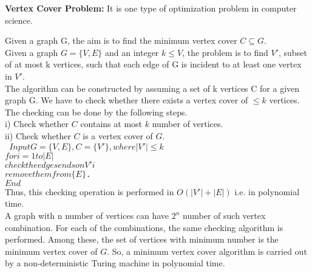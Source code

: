 \documentclass[11pt]{article}
\begin{document}
\vspace*{0.3cm}
\hspace*{0.1cm} \textbf{Vertex Cover Problem:} It is one type of optimization problem in computer science.

Given a graph G, the aim is to find the minimum vertex cover $C \subseteq G$.\\
\hspace*{0.5cm} Given a graph $G = \{V, E\}$ and an integer $k \leq V$, the problem is to find $V'$, subset of at most k vertices,
such that each edge of G is incident to at least one vertex in $V'$.\\
\hspace*{0.5cm} The algorithm can be constructed by assuming a set of k vertices C for a given graph G. We have to
check whether there exists a vertex cover of $\leq k$ vertices.\\
\hspace*{0.5cm} The checking can be done by the following steps.\\

\vspace*{0.2cm}
i) Check whether $C$ contains at most $k$ number of vertices.\\
ii) Check whether $C$ is a vertex cover of $G$.\\
\texttt{
\hspace*{2cm} $Input G = \{V, E\}, C= \{V'\}, where | V' |\leq k$\\
\hspace*{2cm} $for i = 1 to | E |$\\
\hspace*{2.5cm} $check the edges ends on V'i$\\
\hspace*{2.5cm} $remove them from \{E\}$.\\
\hspace*{2cm} $End$\\
}
\vspace*{0.2cm}
Thus, this checking operation is performed in $O(| V' |+| E |)$ i.e. in polynomial time.\\
\hspace*{0.5cm} A graph with n number of vertices can have $2 ^{n}$ number of such vertex combination. For each of the
combinations, the same checking algorithm is performed. Among these, the set of vertices with minimum
number is the minimum vertex cover of $G$. So, a minimum vertex cover algorithm is carried out
by a non-deterministic Turing machine in polynomial time.\\
\end{document}
